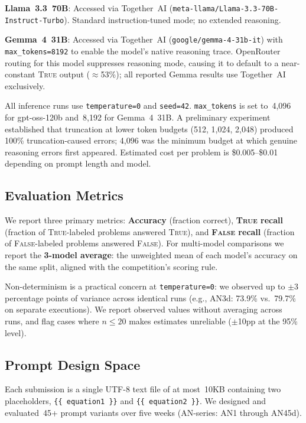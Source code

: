 \documentclass[11pt]{article}
\begin{document}
\textbf{Llama~3.3~70B}: Accessed via Together~AI
(\texttt{meta-llama/Llama-3.3-70B-Instruct-Turbo}). Standard
instruction-tuned mode; no extended reasoning.

\textbf{Gemma~4~31B}: Accessed via Together~AI
(\texttt{google/gemma-4-31b-it}) with \texttt{max\_tokens=8192} to
enable the model's native reasoning trace. OpenRouter routing for this
model suppresses reasoning mode, causing it to default to a
near-constant \textsc{True} output ($\approx$53\%); all reported Gemma
results use Together~AI exclusively.

All inference runs use \texttt{temperature=0} and \texttt{seed=42}.
\texttt{max\_tokens} is set to~4{,}096 for gpt-oss-120b and~8{,}192
for Gemma~4~31B. A preliminary experiment established that truncation
at lower token budgets (512, 1{,}024, 2{,}048) produced 100\%
truncation-caused errors; 4{,}096 was the minimum budget at which
genuine reasoning errors first appeared. Estimated cost per problem is
\$0.005--\$0.01 depending on prompt length and model.

\subsection{Evaluation Metrics}

We report three primary metrics:
\textbf{Accuracy} (fraction correct),
\textbf{\textsc{True} recall} (fraction of \textsc{True}-labeled
problems answered \textsc{True}), and
\textbf{\textsc{False} recall} (fraction of \textsc{False}-labeled
problems answered \textsc{False}).
For multi-model comparisons we report the \textbf{3-model average}:
the unweighted mean of each model's accuracy on the same split, aligned
with the competition's scoring rule.

Non-determinism is a practical concern at \texttt{temperature=0}: we
observed up to $\pm$3 percentage points of variance across identical
runs (e.g., AN3d: 73.9\% vs.\ 79.7\% on separate executions). We
report observed values without averaging across runs, and flag cases
where $n \leq 20$ makes estimates unreliable ($\pm$10pp at the 95\%
level).

\subsection{Prompt Design Space}

Each submission is a single UTF-8 text file of at most~10KB containing
two placeholders, \texttt{\{\{ equation1 \}\}} and
\texttt{\{\{ equation2 \}\}}. We designed and evaluated~45+ prompt
variants over five weeks (AN-series: AN1 through AN45d).
\end{document}
